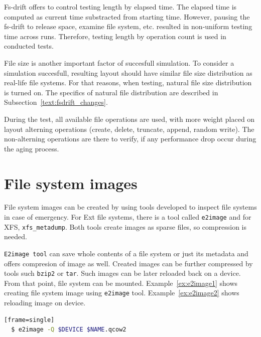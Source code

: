 \documentclass[
  color, %
  table, %
  lof,   %
  lot,   %
]{fithesis3}
\begin{document}
Fs-drift offers to control testing length by elapsed time. The elapsed time is computed as current time substracted from starting time. However, pausing the fs-drift to release space, examine file system, etc. resulted in non-uniform testing time across runs. Therefore, testing length by operation count is used in conducted tests.

File size is another important factor of succesfull simulation. To consider a simulation succesfull, resulting layout should have similar file size distribution as real-life file systems. For that reasons, when testing, natural file size distribution is turned on. The specifics of natural file distribution are described in Subsection~\ref{text:fsdrift_changes}.

During the test, all available file operations are used, with more weight placed on layout alterning operations (create, delete, truncate, append, random write). The non-alterning operations are there to verify, if any performance drop occur during the aging process.

\section{File system images}
File system images can be created by using tools developed to inspect file systems in case of emergency. For Ext file systems, there is a tool called \texttt{e2image} and for XFS, \texttt{xfs\_metadump}. Both tools create images as sparse files, so compression is needed.

\texttt{E2image tool} can save whole contents of a file system or just its metadata and offers compresion of image as well. Created images can be further compressed by tools such \texttt{bzip2} or \texttt{tar}. Such images can be later reloaded back on a device. From that point, file system can be mounted. Example~\ref{ex:e2image1} shows creating file system image using \texttt{e2image} tool. Example~\ref{ex:e2image2} shows reloading image on device.


\begin{lstlisting}[language=bash, label={ex:e2image1}, caption={Creating compressed image using \texttt{e2image}}][frame=single]
  $ e2image -Q $DEVICE $NAME.qcow2
\end{lstlisting}
\end{document}

